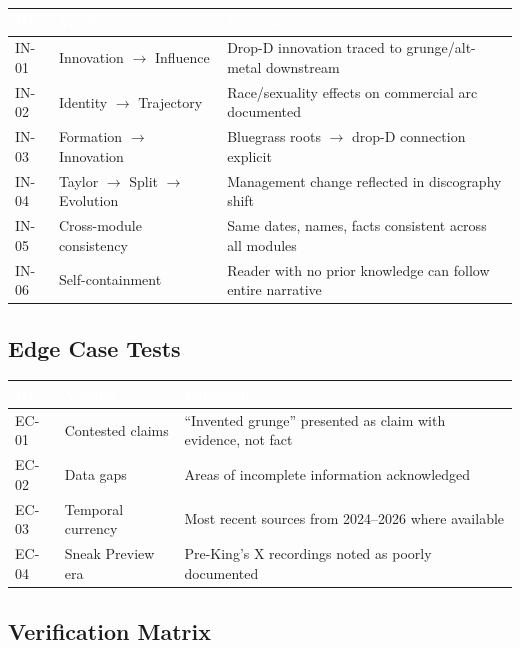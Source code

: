 \documentclass[11pt,letterpaper]{article}
\newcommand{\tableheader}[1]{\textbf{\sffamily\textcolor{white}{#1}}}
\begin{document}
\begin{center}
\begin{tabularx}{\textwidth}{C{1.2cm}L{3cm}X}
\toprule
{}
\tableheader{ID} & \tableheader{Verifies} & \tableheader{Expected} \\
\midrule
IN-01 & Innovation $\rightarrow$ Influence & Drop-D innovation traced to grunge/alt-metal downstream \\
IN-02 & Identity $\rightarrow$ Trajectory & Race/sexuality effects on commercial arc documented \\
IN-03 & Formation $\rightarrow$ Innovation & Bluegrass roots $\rightarrow$ drop-D connection explicit \\
IN-04 & Taylor $\rightarrow$ Split $\rightarrow$ Evolution & Management change reflected in discography shift \\
IN-05 & Cross-module consistency & Same dates, names, facts consistent across all modules \\
IN-06 & Self-containment & Reader with no prior knowledge can follow entire narrative \\
\bottomrule
\end{tabularx}
\end{center}

\subsection{Edge Case Tests}

\begin{center}
\begin{tabularx}{\textwidth}{C{1.2cm}L{3cm}X}
\toprule
{}
\tableheader{ID} & \tableheader{Verifies} & \tableheader{Expected} \\
\midrule
EC-01 & Contested claims & ``Invented grunge'' presented as claim with evidence, not fact \\
EC-02 & Data gaps & Areas of incomplete information acknowledged \\
EC-03 & Temporal currency & Most recent sources from 2024--2026 where available \\
EC-04 & Sneak Preview era & Pre-King's X recordings noted as poorly documented \\
\bottomrule
\end{tabularx}
\end{center}

\subsection{Verification Matrix}
\end{document}
